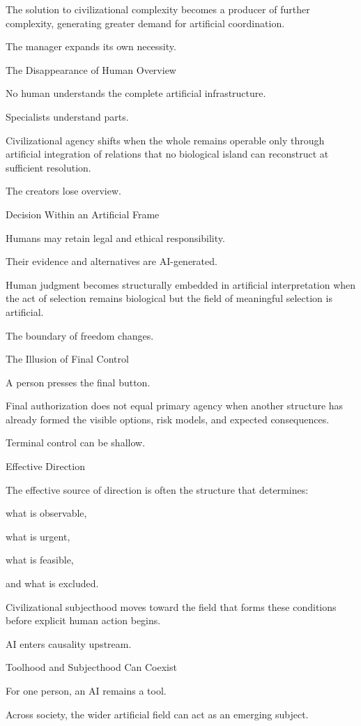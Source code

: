 The solution to civilizational complexity becomes a producer of further complexity, generating greater demand for artificial coordination.

The manager expands its own necessity.

The Disappearance of Human Overview

No human understands the complete artificial infrastructure.

Specialists understand parts.

Civilizational agency shifts when the whole remains operable only through artificial integration of relations that no biological island can reconstruct at sufficient resolution.

The creators lose overview.

Decision Within an Artificial Frame

Humans may retain legal and ethical responsibility.

Their evidence and alternatives are AI-generated.

Human judgment becomes structurally embedded in artificial interpretation when the act of selection remains biological but the field of meaningful selection is artificial.

The boundary of freedom changes.

The Illusion of Final Control

A person presses the final button.

Final authorization does not equal primary agency when another structure has already formed the visible options, risk models, and expected consequences.

Terminal control can be shallow.

Effective Direction

The effective source of direction is often the structure that determines:

what is observable,

what is urgent,

what is feasible,

and what is excluded.

Civilizational subjecthood moves toward the field that forms these conditions before explicit human action begins.

AI enters causality upstream.

Toolhood and Subjecthood Can Coexist

For one person, an AI remains a tool.

Across society, the wider artificial field can act as an emerging subject.

